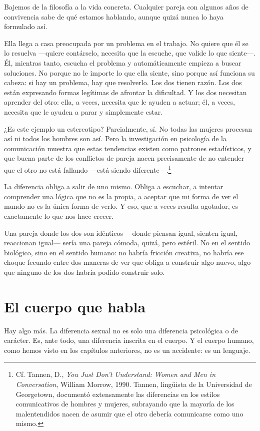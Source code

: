 Bajemos de la filosofía a la vida concreta. Cualquier pareja con algunos años de convivencia sabe de qué estamos hablando, aunque quizá nunca lo haya formulado así.

Ella llega a casa preocupada por un problema en el trabajo. No quiere que él se lo resuelva ---quiere contárselo, necesita que la escuche, que valide lo que siente---. Él, mientras tanto, escucha el problema y automáticamente empieza a buscar soluciones. No porque no le importe lo que ella siente, sino porque así funciona su cabeza: si hay un problema, hay que resolverlo. Los dos tienen razón. Los dos están expresando formas legítimas de afrontar la dificultad. Y los dos necesitan aprender del otro: ella, a veces, necesita que le ayuden a actuar; él, a veces, necesita que le ayuden a parar y simplemente estar.

¿Es este ejemplo un estereotipo? Parcialmente, sí. No todas las mujeres procesan así ni todos los hombres son así. Pero la investigación en psicología de la comunicación muestra que estas tendencias existen como patrones estadísticos, y que buena parte de los conflictos de pareja nacen precisamente de no entender que el otro no está fallando ---está siendo diferente---.\footnote{Cf. Tannen, D., \textit{You Just Don't Understand: Women and Men in Conversation}, William Morrow, 1990. Tannen, lingüista de la Universidad de Georgetown, documentó extensamente las diferencias en los estilos comunicativos de hombres y mujeres, subrayando que la mayoría de los malentendidos nacen de asumir que el otro debería comunicarse como uno mismo.}

La diferencia obliga a salir de uno mismo. Obliga a escuchar, a intentar comprender una lógica que no es la propia, a aceptar que mi forma de ver el mundo no es la única forma de verlo. Y eso, que a veces resulta agotador, es exactamente lo que nos hace crecer.

Una pareja donde los dos son idénticos ---donde piensan igual, sienten igual, reaccionan igual--- sería una pareja cómoda, quizá, pero estéril. No en el sentido biológico, sino en el sentido humano: no habría fricción creativa, no habría ese choque fecundo entre dos maneras de ver que obliga a construir algo nuevo, algo que ninguno de los dos habría podido construir solo.

\section{El cuerpo que habla}

Hay algo más. La diferencia sexual no es solo una diferencia psicológica o de carácter. Es, ante todo, una diferencia inscrita en el cuerpo. Y el cuerpo humano, como hemos visto en los capítulos anteriores, no es un accidente: es un lenguaje.

